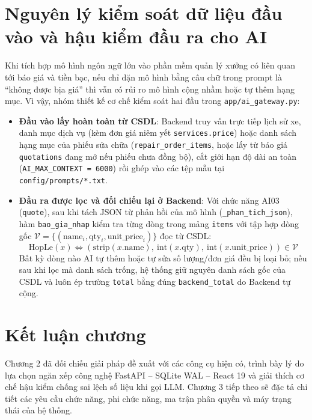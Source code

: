 \section{Nguyên lý kiểm soát dữ liệu đầu vào và hậu kiểm đầu ra cho AI}

Khi tích hợp mô hình ngôn ngữ lớn vào phần mềm quản lý xưởng có liên quan tới báo giá và tiền bạc, nếu chỉ dặn mô hình bằng câu chữ trong prompt là “không được bịa giá” thì vẫn có rủi ro mô hình cộng nhầm hoặc tự thêm hạng mục. Vì vậy, nhóm thiết kế cơ chế kiểm soát hai đầu trong \texttt{app/ai\_gateway.py}:
\begin{itemize}[noitemsep,topsep=2pt]
  \item \textbf{Đầu vào lấy hoàn toàn từ CSDL}: Backend truy vấn trực tiếp lịch sử xe, danh mục dịch vụ (kèm đơn giá niêm yết \texttt{services.price}) hoặc danh sách hạng mục của phiếu sửa chữa (\texttt{repair\_order\_items}, hoặc lấy từ báo giá \texttt{quotations} đang mở nếu phiếu chưa đồng bộ), cắt giới hạn độ dài an toàn (\texttt{AI\_MAX\_CONTEXT = 6000}) rồi ghép vào các tệp mẫu tại \texttt{config/prompts/*.txt}.
  \item \textbf{Đầu ra được lọc và đối chiếu lại ở Backend}: Với chức năng AI03 (\texttt{quote}), sau khi tách JSON từ phản hồi của mô hình (\texttt{\_phan\_tich\_json}), hàm \texttt{bao\_gia\_nhap} kiểm tra từng dòng trong mảng \texttt{items} với tập hợp dòng gốc $\mathcal{V} = \{(\text{name}_i, \text{qty}_i, \text{unit\_price}_i)\}$ đọc từ CSDL:
  \begin{equation}
    \text{HopLe}(x) \iff \left(\text{strip}(x.\text{name}),\ \text{int}(x.\text{qty}),\ \text{int}(x.\text{unit\_price})\right) \in \mathcal{V}
  \end{equation}
  Bất kỳ dòng nào AI tự thêm hoặc tự sửa số lượng/đơn giá đều bị loại bỏ; nếu sau khi lọc mà danh sách trống, hệ thống giữ nguyên danh sách gốc của CSDL và luôn ép trường \texttt{total} bằng đúng \texttt{backend\_total} do Backend tự cộng.
\end{itemize}

\section{Kết luận chương}

Chương 2 đã đối chiếu giải pháp đề xuất với các công cụ hiện có, trình bày lý do lựa chọn ngăn xếp công nghệ FastAPI -- SQLite WAL -- React 19 và giải thích cơ chế hậu kiểm chống sai lệch số liệu khi gọi LLM. Chương 3 tiếp theo sẽ đặc tả chi tiết các yêu cầu chức năng, phi chức năng, ma trận phân quyền và máy trạng thái của hệ thống.

